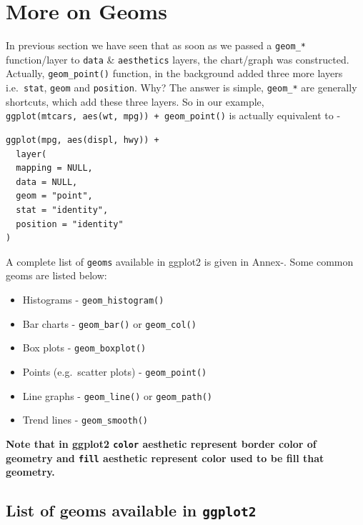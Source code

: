 \documentclass[
]{book}
\providecommand{\tightlist}{%
  \setlength{\itemsep}{0pt}\setlength{\parskip}{0pt}}
\begin{document}
\hypertarget{geoms}{%
\section{More on Geoms}\label{geoms}}

In previous section we have seen that as soon as we passed a \texttt{geom\_*} function/layer to \texttt{data} \& \texttt{aesthetics} layers, the chart/graph was constructed. Actually, \texttt{geom\_point()} function, in the background added three more layers i.e.~\texttt{stat}, \texttt{geom} and \texttt{position}. Why? The answer is simple, \texttt{geom\_*} are generally shortcuts, which add these three layers. So in our example, \texttt{ggplot(mtcars,\ aes(wt,\ mpg))\ +\ geom\_point()} is actually equivalent to -

\begin{verbatim}
ggplot(mpg, aes(displ, hwy)) +
  layer(
  mapping = NULL, 
  data = NULL,
  geom = "point", 
  stat = "identity",
  position = "identity"
)
\end{verbatim}

A complete list of \texttt{geoms} available in ggplot2 is given in Annex-. Some common geoms are listed below:

\begin{itemize}
\tightlist
\item
  Histograms - \texttt{geom\_histogram()}
\item
  Bar charts - \texttt{geom\_bar()} or \texttt{geom\_col()}
\item
  Box plots - \texttt{geom\_boxplot()}
\item
  Points (e.g.~scatter plots) - \texttt{geom\_point()}
\item
  Line graphs - \texttt{geom\_line()} or \texttt{geom\_path()}
\item
  Trend lines - \texttt{geom\_smooth()}
\end{itemize}

\textbf{Note that in ggplot2 \texttt{color} aesthetic represent border color of geometry and \texttt{fill} aesthetic represent color used to be fill that geometry.}

\hypertarget{list-of-geoms-available-in-ggplot2}{%
\subsection{\texorpdfstring{List of geoms available in \texttt{ggplot2}}{List of geoms available in ggplot2}}\label{list-of-geoms-available-in-ggplot2}}
\end{document}
